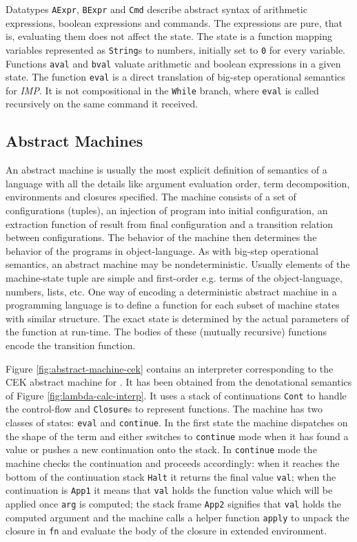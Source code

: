 Datatypes \lstinline!AExpr!, \lstinline!BExpr! and \lstinline!Cmd! describe abstract syntax of arithmetic expressions, boolean expressions and commands.
The expressions are pure, that is, evaluating them does not affect the state.
The state is a function mapping variables represented as \lstinline!String!s to numbers, initially set to \lstinline!0! for every variable.
Functions \lstinline!aval! and \lstinline!bval! valuate arithmetic and boolean expressions in a given state.
The function \lstinline!eval! is a direct translation of big-step operational semantics for \textit{IMP}.
It is not compositional in the \lstinline!While! branch, where \lstinline!eval! is called recursively on the same command it received.

\subsection*{Abstract Machines}
An abstract machine is usually the most explicit definition of semantics of a language with all the details like argument evaluation order, term decomposition, environments and closures specified.
The machine consists of a set of configurations (tuples), an injection of program into initial configuration, an extraction function of result from final configuration and a transition relation between configurations.
The behavior of the machine then determines the behavior of the programs in object-language.
As with big-step operational semantics, an abstract machine may be nondeterministic.
Usually elements of the machine-state tuple are simple and first-order e.g. terms of the object-language, numbers, lists, etc.
One way of encoding a deterministic abstract machine in a programming language is to define a function for each subset of machine states with similar structure.
The exact state is determined by the actual parameters of the function at run-time.
The bodies of these (mutually recursive) functions encode the transition function.

Figure \ref{fig:abstract-machine-cek} contains an interpreter corresponding to the CEK abstract machine for \LC{}.
It has been obtained from the denotational semantics of Figure \ref{fig:lambda-calc-interp}.
It uses a stack of continuations \lstinline!Cont! to handle the control-flow and \lstinline!Closure!s to represent functions.
The machine has two classes of states: \lstinline!eval! and \lstinline!continue!.
In the first state the machine dispatches on the shape of the term and either switches to \lstinline!continue! mode when it has found a value or pushes a new continuation onto the stack.
In \lstinline!continue! mode the machine checks the continuation and proceeds accordingly: when it reaches the bottom of the continuation stack \lstinline!Halt! it returns the final value \lstinline!val!; when the continuation is \lstinline!App1! it means that \lstinline!val! holds the function value which will be applied once \lstinline!arg! is computed; the stack frame \lstinline!App2! signifies that \lstinline!val! holds the computed argument and the machine calls a helper function \lstinline!apply! to unpack the closure in \lstinline!fn! and evaluate the body of the closure in extended environment. 

